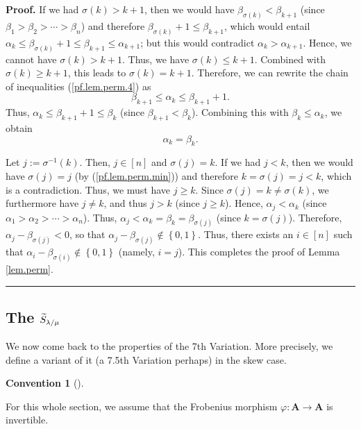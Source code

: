 \documentclass[numbers=enddot,12pt,final,onecolumn,notitlepage]{scrartcl}%
\numberwithin{exer}{section}
\theoremstyle{definition}
\newtheorem{conv}[theo]{Convention}
\newenvironment{convention}[1][]
{\begin{conv}[#1]\begin{leftbar}}
{\end{leftbar}\end{conv}}
\newenvironment{proof}[1][Proof]{\noindent\textbf{#1.} }{\ \rule{0.5em}{0.5em}}
\newenvironment{convention}[1][Convention]{\noindent\textbf{#1.} }{\ \rule{0.5em}{0.5em}}
\theoremstyle{plainsl}
\begin{document}
\begin{proof}
If we had $\sigma\left(  k\right)  >k+1$, then we would have $\beta
_{\sigma\left(  k\right)  }<\beta_{k+1}$ (since $\beta_{1}>\beta_{2}%
>\cdots>\beta_{n}$) and therefore $\beta_{\sigma\left(  k\right)  }+1\leq
\beta_{k+1}$, which would entail $\alpha_{k}\leq\beta_{\sigma\left(  k\right)
}+1\leq\beta_{k+1}\leq\alpha_{k+1}$; but this would contradict $\alpha
_{k}>\alpha_{k+1}$. Hence, we cannot have $\sigma\left(  k\right)  >k+1$.
Thus, we have $\sigma\left(  k\right)  \leq k+1$. Combined with $\sigma\left(
k\right)  \geq k+1$, this leads to $\sigma\left(  k\right)  =k+1$. Therefore,
we can rewrite the chain of inequalities (\ref{pf.lem.perm.4}) as%
\[
\beta_{k+1}\leq\alpha_{k}\leq\beta_{k+1}+1.
\]
Thus, $\alpha_{k}\leq\beta_{k+1}+1\leq\beta_{k}$ (since $\beta_{k+1}<\beta
_{k}$). Combining this with $\beta_{k}\leq\alpha_{k}$, we obtain
\[
\alpha_{k}=\beta_{k}.
\]


Let $j:=\sigma^{-1}\left(  k\right)  $. Then, $j\in\left[  n\right]  $ and
$\sigma\left(  j\right)  =k$. If we had $j<k$, then we would have
$\sigma\left(  j\right)  =j$ (by (\ref{pf.lem.perm.min})) and therefore
$k=\sigma\left(  j\right)  =j<k$, which is a contradiction. Thus, we must have
$j\geq k$. Since $\sigma\left(  j\right)  =k\neq\sigma\left(  k\right)  $, we
furthermore have $j\neq k$, and thus $j>k$ (since $j\geq k$). Hence,
$\alpha_{j}<\alpha_{k}$ (since $\alpha_{1}>\alpha_{2}>\cdots>\alpha_{n}$).
Thus, $\alpha_{j}<\alpha_{k}=\beta_{k}=\beta_{\sigma\left(  j\right)  }$
(since $k=\sigma\left(  j\right)  $). Therefore, $\alpha_{j}-\beta
_{\sigma\left(  j\right)  }<0$, so that $\alpha_{j}-\beta_{\sigma\left(
j\right)  }\notin\left\{  0,1\right\}  $. Thus, there exists an $i\in\left[
n\right]  $ such that $\alpha_{i}-\beta_{\sigma\left(  i\right)  }%
\notin\left\{  0,1\right\}  $ (namely, $i=j$). This completes the proof of
Lemma \ref{lem.perm}.
\end{proof}

\subsection{The $\protect\widetilde{S}_{\lambda/\mu}$}

We now come back to the properties of the 7th Variation. More precisely, we
define a variant of it (a 7.5th Variation perhaps) in the skew case.

\begin{convention}
For this whole section, we assume that the Frobenius morphism $\varphi
:\mathbf{A}\rightarrow\mathbf{A}$ is invertible.
\end{convention}
\end{document}
